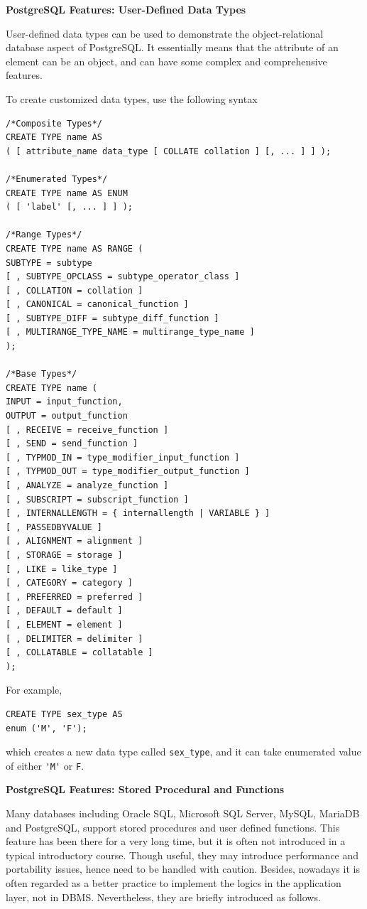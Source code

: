 \vspace{0.1in}
\noindent \textbf{PostgreSQL Features: User-Defined Data Types}
\vspace{0.1in}

User-defined data types can be used to demonstrate the object-relational database aspect of PostgreSQL. It essentially means that the attribute of an element can be an object, and can have some complex and comprehensive features.

To create customized data types, use the following syntax
\begin{lstlisting}
/*Composite Types*/
CREATE TYPE name AS
( [ attribute_name data_type [ COLLATE collation ] [, ... ] ] );

/*Enumerated Types*/
CREATE TYPE name AS ENUM
( [ 'label' [, ... ] ] );

/*Range Types*/
CREATE TYPE name AS RANGE (
SUBTYPE = subtype
[ , SUBTYPE_OPCLASS = subtype_operator_class ]
[ , COLLATION = collation ]
[ , CANONICAL = canonical_function ]
[ , SUBTYPE_DIFF = subtype_diff_function ]
[ , MULTIRANGE_TYPE_NAME = multirange_type_name ]
);

/*Base Types*/
CREATE TYPE name (
INPUT = input_function,
OUTPUT = output_function
[ , RECEIVE = receive_function ]
[ , SEND = send_function ]
[ , TYPMOD_IN = type_modifier_input_function ]
[ , TYPMOD_OUT = type_modifier_output_function ]
[ , ANALYZE = analyze_function ]
[ , SUBSCRIPT = subscript_function ]
[ , INTERNALLENGTH = { internallength | VARIABLE } ]
[ , PASSEDBYVALUE ]
[ , ALIGNMENT = alignment ]
[ , STORAGE = storage ]
[ , LIKE = like_type ]
[ , CATEGORY = category ]
[ , PREFERRED = preferred ]
[ , DEFAULT = default ]
[ , ELEMENT = element ]
[ , DELIMITER = delimiter ]
[ , COLLATABLE = collatable ]
);
\end{lstlisting}
For example,
\begin{lstlisting}
CREATE TYPE sex_type AS
enum ('M', 'F');
\end{lstlisting}
which creates a new data type called \verb|sex_type|, and it can take enumerated value of either \verb|'M'| or \verb|F|.

\vspace{0.1in}
\noindent \textbf{PostgreSQL Features: Stored Procedural and Functions}
\vspace{0.1in}

Many databases including Oracle SQL, Microsoft SQL Server, MySQL, MariaDB and PostgreSQL, support stored procedures and user defined functions. This feature has been there for a very long time, but it is often not introduced in a typical introductory course. Though useful, they may introduce performance and portability issues, hence need to be handled with caution. Besides, nowadays it is often regarded as a better practice to implement the logics in the application layer, not in DBMS. Nevertheless, they are briefly introduced as follows.

